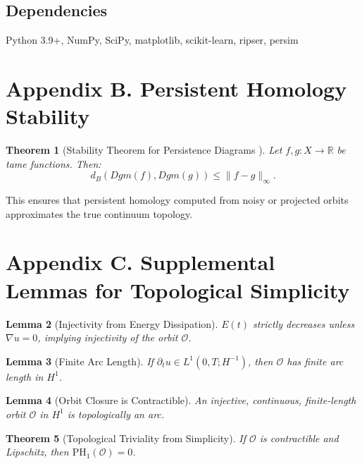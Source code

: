 \documentclass[11pt]{article}
\newtheorem{theorem}{Theorem}[section]
\newtheorem{lemma}[theorem]{Lemma}
\theoremstyle{definition}
\begin{document}
\subsection*{Dependencies}
Python 3.9+, NumPy, SciPy, matplotlib, scikit-learn, ripser, persim


\section{Appendix B. Persistent Homology Stability}
\label{sec:appendixB}

\begin{theorem}[Stability Theorem for Persistence Diagrams \cite{CohenSteiner2007}]
Let $f, g : X \to \mathbb{R}$ be tame functions. Then:
\[
d_B(Dgm(f), Dgm(g)) \le \|f - g\|_\infty.
\]
\end{theorem}

This ensures that persistent homology computed from noisy or projected orbits approximates the true continuum topology.


\section{Appendix C. Supplemental Lemmas for Topological Simplicity}
\label{sec:appendixC}

\begin{lemma}[Injectivity from Energy Dissipation]
$E(t)$ strictly decreases unless $\nabla u = 0$, implying injectivity of the orbit $\mathcal{O}$.
\end{lemma}

\begin{lemma}[Finite Arc Length]
If $\partial_t u \in L^1(0, T; H^{-1})$, then $\mathcal{O}$ has finite arc length in $H^1$.
\end{lemma}

\begin{lemma}[Orbit Closure is Contractible]
An injective, continuous, finite-length orbit $\mathcal{O}$ in $H^1$ is topologically an arc.
\end{lemma}

\begin{theorem}[Topological Triviality from Simplicity]
If $\mathcal{O}$ is contractible and Lipschitz, then $\mathrm{PH}_1(\mathcal{O}) = 0$.
\end{theorem}
\end{document}
